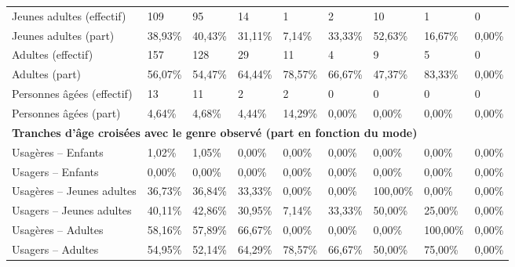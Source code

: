 \begin{longtable}{p{3.7cm}p{0.9cm}p{0.9cm}p{0.9cm}p{0.9cm}p{0.9cm}p{0.9cm}p{0.9cm}p{0.9cm}}
    \small{Jeunes adultes (effectif)} & \small{109} & \small{95} & \small{14} & \small{1} & \small{2} & \small{10} & \small{1} & \small{0}\\    
    \small{Jeunes adultes (part)} & \small{38,93\%} & \small{40,43\%} & \small{31,11\%} & \small{7,14\%} & \small{33,33\%} & \small{52,63\%} & \small{16,67\%} & \small{0,00\%}\\    
    \small{Adultes (effectif)} & \small{157} & \small{128} & \small{29} & \small{11} & \small{4} & \small{9} & \small{5} & \small{0}\\    
    \small{Adultes (part)} & \small{56,07\%} & \small{54,47\%} & \small{64,44\%} & \small{78,57\%} & \small{66,67\%} & \small{47,37\%} & \small{83,33\%} & \small{0,00\%}\\   
    \small{Personnes âgées (effectif)} & \small{13} & \small{11} & \small{2} & \small{2} & \small{0} & \small{0} & \small{0} & \small{0}\\   
    \small{Personnes âgées (part)} & \small{4,64\%} & \small{4,68\%} & \small{4,44\%} & \small{14,29\%} & \small{0,00\%} & \small{0,00\%} & \small{0,00\%} & \small{0,00\%}\\
    \hline
\multicolumn{9}{l}{\textbf{Tranches d'âge croisées avec le genre observé (part en fonction du mode)}}\\
    \small{Usagères – Enfants} & \small{1,02\%} & \small{1,05\%} & \small{0,00\%} & \small{0,00\%} & \small{0,00\%} & \small{0,00\%} & \small{0,00\%} & \small{0,00\%}\\    
    \small{Usagers – Enfants} & \small{0,00\%} & \small{0,00\%} & \small{0,00\%} & \small{0,00\%} & \small{0,00\%} & \small{0,00\%} & \small{0,00\%} & \small{0,00\%}\\   
    \small{Usagères – Jeunes adultes} & \small{36,73\%} & \small{36,84\%} & \small{33,33\%} & \small{0,00\%} & \small{0,00\%} & \small{100,00\%} & \small{0,00\%} & \small{0,00\%}\\    
    \small{Usagers – Jeunes adultes} & \small{40,11\%} & \small{42,86\%} & \small{30,95\%} & \small{7,14\%} & \small{33,33\%} & \small{50,00\%} & \small{25,00\%} & \small{0,00\%}\\    
    \small{Usagères – Adultes} & \small{58,16\%} & \small{57,89\%} & \small{66,67\%} & \small{0,00\%} & \small{0,00\%} & \small{0,00\%} & \small{100,00\%} & \small{0,00\%}\\   
    \small{Usagers – Adultes} & \small{54,95\%} & \small{52,14\%} & \small{64,29\%} & \small{78,57\%} & \small{66,67\%} & \small{50,00\%} & \small{75,00\%} & \small{0,00\%}\\    

\end{longtable}
